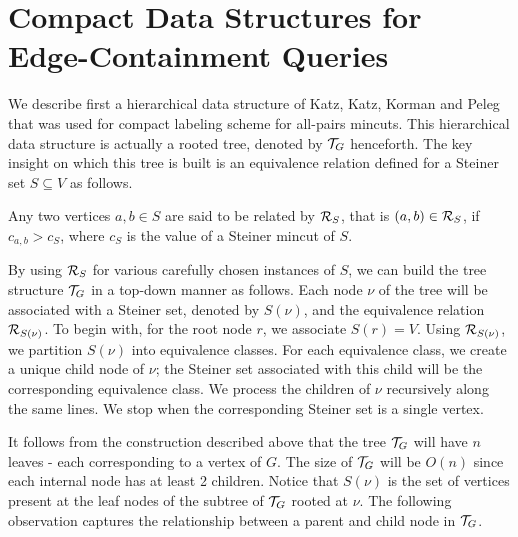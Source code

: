 \chapter{Compact Data Structures for Edge-Containment Queries}

We describe first a hierarchical data structure of Katz, Katz, Korman and Peleg \cite{DBLP:journals/siamcomp/KatzKKP04}
that was used for compact labeling scheme for all-pairs mincuts. This hierarchical data structure is actually a rooted tree, denoted by ${\cal T}_G$ henceforth. 
The key insight on which this tree is built is an equivalence relation defined for a Steiner set $S\subseteq V$ as follows.


\begin{definition}
Any two vertices $a,b\in S$ are said to be related by ${\cal R}_S$, that is $(a,b)\in {\cal R}_S$, if
$c_{a,b}>c_S$, where $c_S$ is the value of a Steiner mincut of $S$.
\end{definition}



By using ${\cal R}_S$ for various carefully chosen instances of $S$, we can build the tree structure ${\cal T}_G$ in a top-down manner as follows. Each node $\nu$ of the tree will be associated with a Steiner set, denoted by $S(\nu)$, and the equivalence relation ${\cal R}_{S(\nu)}$. To begin with, for the root node $r$, we associate $S(r)=V$.
Using ${\cal  R}_{S(\nu)}$, we partition $S(\nu)$ into equivalence classes. For each equivalence class, we create a unique child node of $\nu$; the Steiner set associated with this child will be the corresponding equivalence class. We process the children of $\nu$ recursively along the same lines. We stop when the corresponding Steiner set is a single vertex. 

It follows from the construction described above that the tree ${\cal T}_G$ will have $n$ leaves - each corresponding to a vertex of $G$. The size of ${\cal T}_G$ will be $O(n)$ since each internal node has at least 2 children. Notice that $S(\nu)$ is the set of vertices present at the leaf nodes of the subtree of ${\cal T}_G$ rooted at $\nu$. The following observation captures the relationship between a parent and child node in 
${\cal T}_G$.

